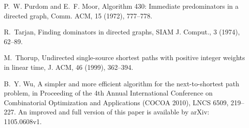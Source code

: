 \documentclass[review]{elsarticle}
\begin{document}
\begin{thebibliography}{99}
P.~W. Purdom and E.~F. Moor, Algorithm 430: Immediate
predominators in a directed graph, Comm. ACM, 15 (1972),
777--778.

R.~Tarjan, Finding dominators in directed graphs, SIAM
J. Comput., 3 (1974), 62--89.

 M.~Thorup, Undirected single-source shortest paths with positive integer weights in linear time, J. ACM, 46 (1999), 362--394.

 B.~Y. Wu, A simpler and more efficient algorithm for the
next-to-shortest path problem, in Proceeding of the 4th Annual International Conference on Combinatorial Optimization and Applications (COCOA 2010), LNCS 6509, 219--227. An improved and full version of this paper is available by arXiv: 1105.0608v1.

\end{thebibliography}
\end{document}
